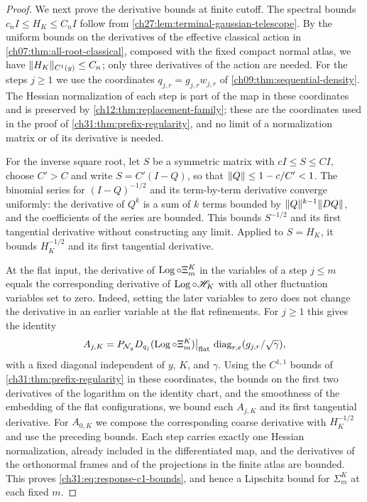 \begin{proof}
We next prove the derivative bounds at finite cutoff. The spectral bounds $c_nI\le H_K\le C_nI$ follow from \cref{ch27:lem:terminal-gaussian-telescope}. By the uniform bounds on the derivatives of the effective classical action in \cref{ch07:thm:all-root-classical}, composed with the fixed compact normal atlas, we have $\lVert H_K\rVert_{C^1(y)}\le C_n$; only three derivatives of the action are needed. For the steps $j\ge1$ we use the coordinates $q_{j,r}=g_{j,r}w_{j,r}$ of \cref{ch09:thm:sequential-density}. The Hessian normalization of each step is part of the map in these coordinates and is preserved by \cref{ch12:thm:replacement-family}; these are the coordinates used in the proof of \cref{ch31:thm:prefix-regularity}, and no limit of a normalization matrix or of its derivative is needed.

For the inverse square root, let $S$ be a symmetric matrix with $cI\le S\le CI$, choose $C'>C$ and write $S=C'(I-Q)$, so that $\lVert Q\rVert\le1-c/C'<1$. The binomial series for $(I-Q)^{-1/2}$ and its term-by-term derivative converge uniformly: the derivative of $Q^k$ is a sum of $k$ terms bounded by $\lVert Q\rVert^{k-1}\lVert DQ\rVert$, and the coefficients of the series are bounded. This bounds $S^{-1/2}$ and its first tangential derivative without constructing any limit. Applied to $S=H_K$, it bounds $H_K^{-1/2}$ and its first tangential derivative.

At the flat input, the derivative of $\operatorname{Log}\circ\Xi_m^K$ in the variables of a step $j\le m$ equals the corresponding derivative of $\operatorname{Log}\circ\mathscr H_K$ with all other fluctuation variables set to zero. Indeed, setting the later variables to zero does not change the derivative in an earlier variable at the flat refinements. For $j\ge1$ this gives the identity
\[
 A_{j,K}=P_{\mathcal N_{y}}D_{q_j}(\operatorname{Log}\circ\Xi_m^K)\big|_{\rm flat}\,\operatorname{diag}_{r,e}(g_{j,r}/\sqrt\gamma),
\]
with a fixed diagonal independent of $y$, $K$, and $\gamma$. Using the $C^{1,1}$ bounds of \cref{ch31:thm:prefix-regularity} in these coordinates, the bounds on the first two derivatives of the logarithm on the identity chart, and the smoothness of the embedding of the flat configurations, we bound each $A_{j,K}$ and its first tangential derivative. For $A_{0,K}$ we compose the corresponding coarse derivative with $H_K^{-1/2}$ and use the preceding bounds. Each step carries exactly one Hessian normalization, already included in the differentiated map, and the derivatives of the orthonormal frames and of the projections in the finite atlas are bounded. This proves \eqref{ch31:eq:response-c1-bounds}, and hence a Lipschitz bound for $\Sigma_m^K$ at each fixed $m$.


\end{proof}
